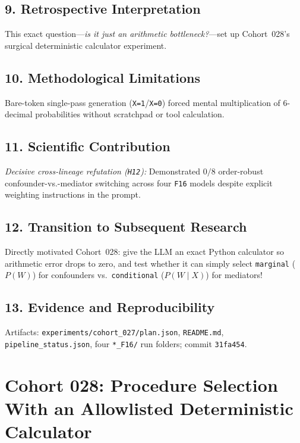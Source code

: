 \subsection*{9. Retrospective Interpretation}
This exact question---\emph{is it just an arithmetic bottleneck?}---set up Cohort~028's surgical deterministic calculator experiment.

\subsection*{10. Methodological Limitations}
Bare-token single-pass generation (\texttt{X=1}/\texttt{X=0}) forced mental multiplication of 6-decimal probabilities without scratchpad or tool calculation.

\subsection*{11. Scientific Contribution}
\emph{Decisive cross-lineage refutation (\texttt{H12}):} Demonstrated $0/8$ order-robust confounder-vs.-mediator switching across four \texttt{F16} models despite explicit weighting instructions in the prompt.

\subsection*{12. Transition to Subsequent Research}
Directly motivated Cohort~028: give the LLM an exact Python calculator so arithmetic error drops to zero, and test whether it can simply select \texttt{marginal} ($P(W)$) for confounders vs.\ \texttt{conditional} ($P(W\mid X)$) for mediators!

\subsection*{13. Evidence and Reproducibility}
Artifacts: \texttt{experiments/cohort\_027/plan.json}, \texttt{README.md}, \texttt{pipeline\_status.json}, four \texttt{*\_F16/} run folders; commit \texttt{31fa454}.

\section{Cohort 028: Procedure Selection With an Allowlisted Deterministic Calculator}

